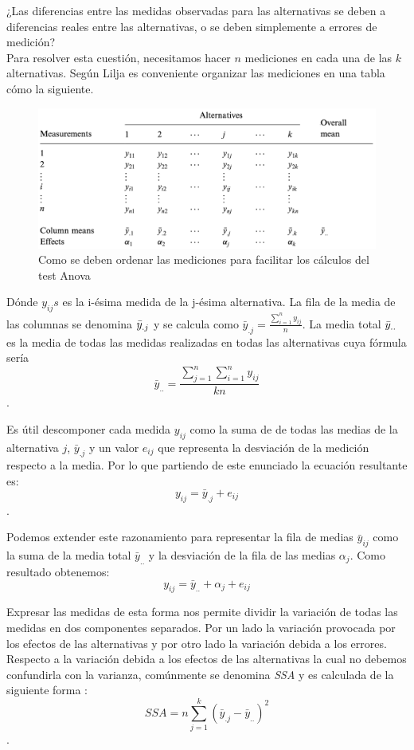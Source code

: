 ¿Las diferencias entre las medidas observadas para las alternativas se deben a diferencias reales entre las alternativas, o se deben simplemente a errores de medición? \cite{lilja_2000} \\

Para resolver esta cuestión, necesitamos hacer $n$ mediciones en cada una de las $k$ alternativas. Según Lilja \cite{lilja_2000} es conveniente organizar las mediciones en una tabla cómo la siguiente. 
 
\begin{figure}[H]
    \centering
    \includegraphics[scale=0.6]{doc/assets/images/Capitulo3/lilja_recommend.png}
    \caption{Como se deben ordenar las mediciones para facilitar los cálculos del test Anova \cite{lilja_2000}}
    \label{fig:Anova_liljal}
\end{figure}

Dónde $y_{ij}s$ es la i-ésima medida de la j-ésima alternativa. La fila de la media de las columnas se denomina $\Bar{y}_{.j}$ y se calcula como $
\bar{y}_{. j}=\frac{\sum_{i=1}^{n} y_{i j}}{n}
$. La media total $\Bar{y}_{..}$ es la media de todas las medidas realizadas en todas las alternativas cuya fórmula sería $$
\bar{y}_{. .}=\frac{\sum_{j=1}^{n} \sum_{i=1}^{n} y_{i j}}{k n}
$$.

Es útil descomponer cada medida $y_{ij}$ como la suma de de todas las medias de la alternativa $j$, $\bar{y}_{.j}$ y un valor $e_{ij}$ que representa la desviación de la medición respecto a la media. Por lo que partiendo de este enunciado la ecuación resultante es: $$y_{ij}=\bar{y}_{.j} + e_{ij}$$.

Podemos extender este razonamiento para representar la fila de medias $\bar{y}_{ij}$ como la suma de la  media total $\bar{y}_{..}$ y la desviación de la fila de las medias $\alpha_j$. Como resultado obtenemos: $$
y_{i j}=\bar{y}_{. .}+\alpha_{j}+e_{i j}
$$

Expresar las medidas de esta forma nos permite dividir la variación de todas las medidas en dos componentes separados. Por un lado la variación provocada por los efectos de las alternativas y por otro lado la variación debida a los errores. Respecto a la variación debida a los efectos de las alternativas la cual no debemos confundirla con la varianza, comúnmente se denomina \textit{SSA} y es calculada de la siguiente forma :  $$S S A=n \sum_{j=1}^{k}\left(\bar{y}_{. j}-\bar{y}_{. .}\right)^{2}$$. 

